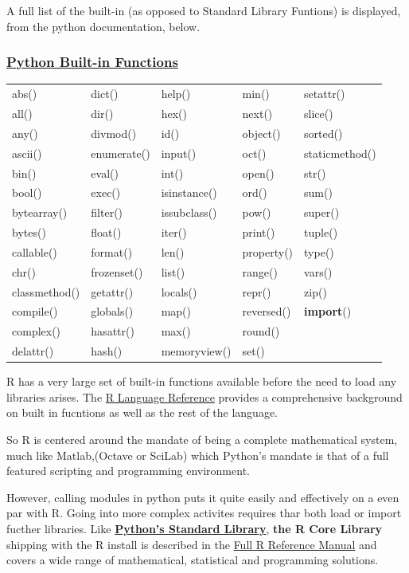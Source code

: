 \documentclass[]{book}
\theoremstyle{definition}
\theoremstyle{definition}
\theoremstyle{definition}
\theoremstyle{remark}
\begin{document}
A full list of the built-in (as opposed to Standard Library Funtions) is
displayed, from the python documentation, below.

\subsubsection{\texorpdfstring{\href{https://docs.python.org/3.6/library/functions.html}{Python
Built-in
Functions}}{Python Built-in Functions}}\label{python-built-in-functions}

\begin{longtable}[]{@{}lllll@{}}
\toprule
abs() & dict() & help() & min() & setattr()\tabularnewline
all() & dir() & hex() & next() & slice()\tabularnewline
any() & divmod() & id() & object() & sorted()\tabularnewline
ascii() & enumerate() & input() & oct() & staticmethod()\tabularnewline
bin() & eval() & int() & open() & str()\tabularnewline
bool() & exec() & isinstance() & ord() & sum()\tabularnewline
bytearray() & filter() & issubclass() & pow() & super()\tabularnewline
bytes() & float() & iter() & print() & tuple()\tabularnewline
callable() & format() & len() & property() & type()\tabularnewline
chr() & frozenset() & list() & range() & vars()\tabularnewline
classmethod() & getattr() & locals() & repr() & zip()\tabularnewline
compile() & globals() & map() & reversed() &
\textbf{import}()\tabularnewline
complex() & hasattr() & max() & round() &\tabularnewline
delattr() & hash() & memoryview() & set() &\tabularnewline
\bottomrule
\end{longtable}

R has a very large set of built-in functions available before the need
to load any libraries arises. The
\href{https://cran.r-project.org/doc/manuals/r-release/R-lang.html}{R
Language Reference} provides a comprehensive background on built in
fucntions as well as the rest of the language.

So R is centered around the mandate of being a complete mathematical
system, much like Matlab,(Octave or SciLab) which Python's mandate is
that of a full featured scripting and programming environment.

However, calling  modules in python puts it
quite easily and effectively on a even par with R. Going into more
complex activites requires thar both load or import fucther libraries.
Like
\href{https://docs.python.org/3/library/index.html}{\textbf{Python's
Standard Library}}, \textbf{the R Core Library} shipping with the R
install is described in the
\href{https://cran.r-project.org/doc/manuals/r-release/fullrefman.pdf}{Full
R Reference Manual} and covers a wide range of mathematical, statistical
and programming solutions.
\end{document}
